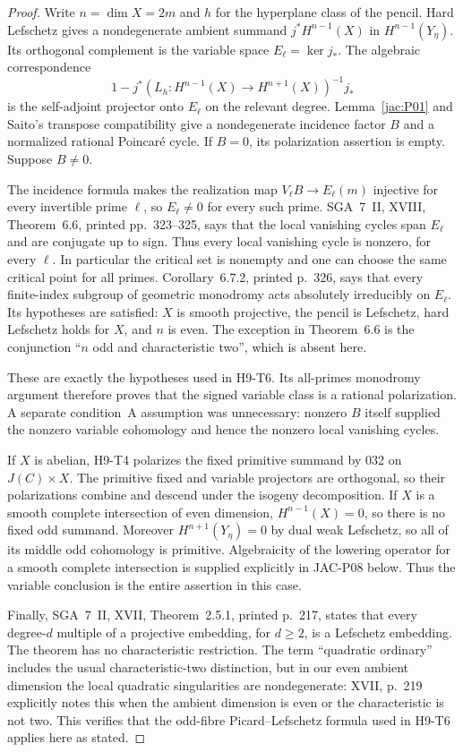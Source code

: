 \begin{proof}
Write $n=\dim X=2m$ and $h$ for the hyperplane class of the pencil.
Hard Lefschetz gives a nondegenerate ambient summand
$j^*H^{n-1}(X)$ in $H^{n-1}(Y_\eta)$.  Its orthogonal complement is
the variable space $E_\ell=\ker j_*$.  The algebraic correspondence
\[
 1-j^*(L_h:H^{n-1}(X)\longrightarrow H^{n+1}(X))^{-1}j_*
\]
is the self-adjoint projector onto $E_\ell$ on the relevant degree.
Lemma~\ref{jac:P01} and Saito's transpose compatibility give a
nondegenerate incidence factor $B$ and a normalized rational
Poincar\'e cycle.  If $B=0$, its polarization assertion is empty.
Suppose $B\ne0$.

The incidence formula makes the realization map
$V_\ell B\to E_\ell(m)$ injective for every invertible prime $\ell$,
so $E_\ell\ne0$ for every such prime.  SGA~7~II, XVIII,
Theorem~6.6, printed pp.~323--325, says that the local vanishing
cycles span $E_\ell$ and are conjugate up to sign.  Thus every local
vanishing cycle is nonzero, for every $\ell$.  In particular the
critical set is nonempty and one can choose the same critical point
for all primes.  Corollary~6.7.2, printed p.~326, says that every
finite-index subgroup of geometric monodromy acts absolutely
irreducibly on $E_\ell$.  Its hypotheses are satisfied: $X$ is smooth
projective, the pencil is Lefschetz, hard Lefschetz holds for $X$, and
$n$ is even.  The exception in Theorem~6.6 is the conjunction
``$n$ odd and characteristic two'', which is absent here.

These are exactly the hypotheses used in H9-T6.  Its all-primes
monodromy argument therefore proves that the signed variable class
is a rational polarization.  A separate condition~A assumption was
unnecessary: nonzero $B$ itself supplied the nonzero variable
cohomology and hence the nonzero local vanishing cycles.

If $X$ is abelian, H9-T4 polarizes the fixed primitive summand by 032
on $J(C)\times X$.  The primitive fixed and variable projectors are
orthogonal, so their polarizations combine and descend under the
isogeny decomposition.  If $X$ is a smooth complete intersection of
even dimension, $H^{n-1}(X)=0$, so there is no fixed odd summand.
Moreover $H^{n+1}(Y_\eta)=0$ by dual weak Lefschetz, so all of its
middle odd cohomology is primitive.  Algebraicity of the lowering
operator for a smooth complete intersection is supplied explicitly
in JAC-P08 below.  Thus the variable conclusion is the entire
assertion in this case.

Finally, SGA~7~II, XVII, Theorem~2.5.1, printed p.~217, states that
every degree-$d$ multiple of a projective embedding, for $d\ge2$,
is a Lefschetz embedding.  The theorem has no characteristic
restriction.  The term ``quadratic ordinary'' includes the usual
characteristic-two distinction, but in our even ambient dimension
the local quadratic singularities are nondegenerate: XVII, p.~219
explicitly notes this when the ambient dimension is even or the
characteristic is not two.  This verifies that the odd-fibre
Picard--Lefschetz formula used in H9-T6 applies here as stated.
\end{proof}

